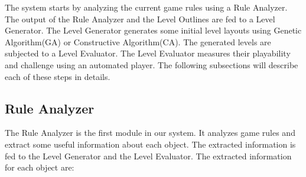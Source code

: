 \documentclass[letterpaper]{article}
\begin{document}
The system starts by analyzing the current game rules using a Rule Analyzer. The output of the Rule Analyzer and the Level Outlines are fed to a Level Generator. The Level Generator generates some initial level layouts using Genetic Algorithm(GA) or Constructive Algorithm(CA). The generated levels are subjected to a Level Evaluator. The Level Evaluator measures their playability and challenge using an automated player. The following subsections will describe each of these steps in details.

\subsection{Rule Analyzer}
The Rule Analyzer is the first module in our system. It analyzes game rules and extract some useful information about each object. The extracted information is fed to the Level Generator and the Level Evaluator. The extracted information for each object are:
\end{document}
